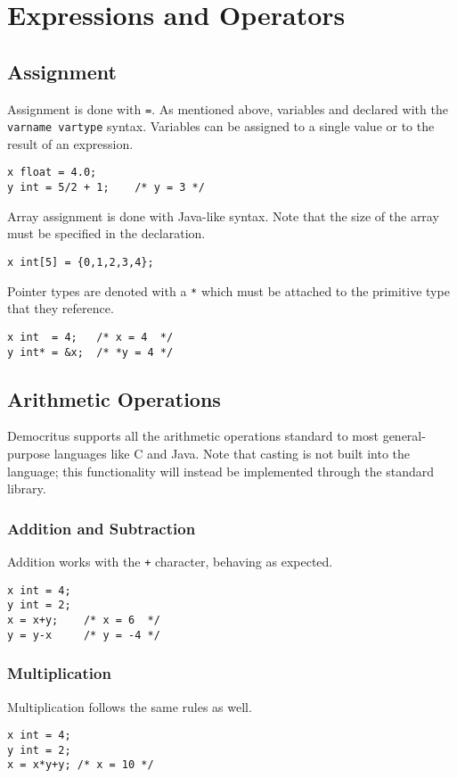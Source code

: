 \chapter{Expressions and Operators}
	\section{Assignment}
		Assignment is done with \texttt{=}. As mentioned above, variables and declared with the \texttt{varname vartype} syntax. Variables can be assigned to a single value or to the result of an expression. 
		
		\begin{lstlisting}
x float = 4.0;
y int = 5/2 + 1; 	/* y = 3 */
		\end{lstlisting}
		
		\noindent Array assignment is done with Java-like syntax. Note that the size of the array must be specified in the declaration. 
		
		\begin{lstlisting}
x int[5] = {0,1,2,3,4};
		\end{lstlisting}
		
		\noindent Pointer types are denoted with a \texttt{*} which must be attached to the primitive type that they reference.
		
		\begin{lstlisting}
x int  = 4;   /* x = 4  */
y int* = &x;  /* *y = 4 */
		\end{lstlisting}
		
	\section{Arithmetic Operations}
		Democritus supports all the arithmetic operations standard to most general-purpose languages like C and Java. Note that casting is not built into the language; this functionality will instead be implemented through the standard library.
		
		\subsection{Addition and Subtraction}
			Addition works with the \texttt{+} character, behaving as expected.
			\begin{lstlisting}
x int = 4;
y int = 2;
x = x+y; 	/* x = 6  */
y = y-x 	/* y = -4 */
			\end{lstlisting}
						
		\subsection{Multiplication}
			Multiplication follows the same rules as well. 
			\begin{lstlisting}
x int = 4;
y int = 2;
x = x*y+y; /* x = 10 */
			\end{lstlisting}
			

